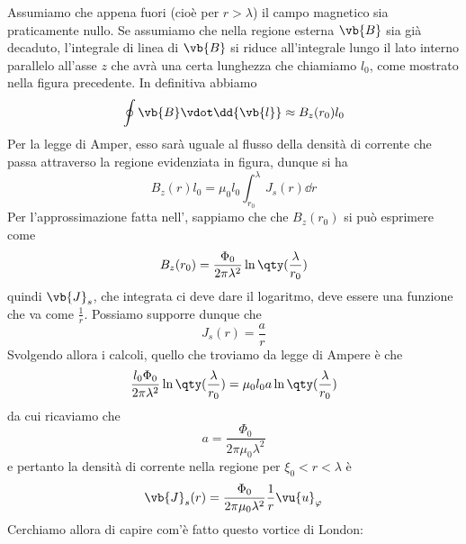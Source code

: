 \hspace{-0.6cm}Assumiamo che appena fuori (cioè per $r>\lambda$) il campo magnetico sia praticamente nullo. Se assumiamo che nella regione esterna $\vb{B}$ sia già decaduto, l'integrale di linea di $\vb{B}$ si riduce all'integrale lungo il lato interno parallelo all'asse $z$ che avrà una certa lunghezza che chiamiamo $l_0$, come mostrato nella figura precedente. In definitiva abbiamo
\begin{equation*}
   \oint \vb{B} \vdot \dd{\vb{l}}
   \approx B_z(r_0) l_0
\end{equation*}
Per la legge di Amper, esso sarà uguale al flusso della densità di corrente che passa attraverso la regione evidenziata in figura, dunque si ha
\begin{equation*}
   B_z(r) l_0
   =\mu_0 l_0 \int_{r_0}^{\lambda} J_s(r) \dd{r}
\end{equation*}
Per l'approssimazione fatta nell', sappiamo che che $B_z(r_0)$ si può esprimere come
\begin{equation*}
   B_z(r_0)
   =\frac{\Phi_0}{2\pi \lambda^2} \ln\qty(\frac{\lambda}{r_0})
\end{equation*}
quindi $\vb{J}_s$, che integrata ci deve dare il logaritmo, deve essere una funzione che va come $\frac{1}{r}$. Possiamo supporre dunque che
\begin{equation*}
   J_s(r)
   =\frac{a}{r}
\end{equation*}
Svolgendo allora i calcoli, quello che troviamo da legge di Ampere è che
\begin{equation*}
   \frac{l_0 \Phi_0}{2\pi \lambda^2} \ln\qty(\frac{\lambda}{r_0})
   =\mu_0 l_0 a \ln\qty(\frac{\lambda}{r_0})
\end{equation*}
da cui ricaviamo che
\begin{equation*}
   a
   =\frac{\Phi_0}{2\pi \mu_0 \lambda^2}
\end{equation*}
e pertanto la densità di corrente nella regione per $\xi_0 < r < \lambda$ è
\begin{equation*}
   \vb{J}_s(r)
   =\frac{\Phi_0}{2\pi \mu_0 \lambda^2} \frac{1}{r} \vu{u}_{\varphi}
\end{equation*}
Cerchiamo allora di capire com'è fatto questo vortice di London:
